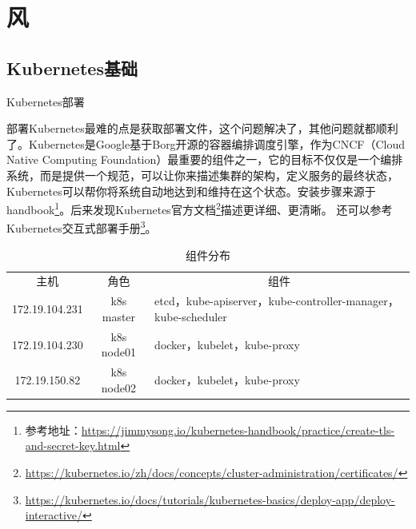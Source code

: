 \documentclass[8pt]{book}
\makeatletter
\numberwithin{dummy}{section}
\theoremstyle{ocrenumbox}
\theoremstyle{blacknumex}
\theoremstyle{blacknumbox}
\theoremstyle{ocrenum}
\renewcommand{\section}{\@startsection{section}{1}{\z@}
	{-4ex \@plus -1ex \@minus -.4ex}
	{1ex \@plus.2ex }
	{\normalfont\large\sffamily\bfseries}}
\newif\ifusechapterimage
\newcommand{\thechapterimage}{}%
\newcommand{\chapterimage}[1]{\ifusechapterimage\renewcommand{\thechapterimage}{#1}\fi}%
\makeatother
\begin{document}


\part{风}


\chapterimage{chapterhead2.pdf} %

\chapter{Kubernetes基础}

\section{Kubernetes部署}

部署Kubernetes最难的点是获取部署文件，这个问题解决了，其他问题就都顺利了。Kubernetes是Google基于Borg开源的容器编排调度引擎，作为CNCF（Cloud Native Computing Foundation）最重要的组件之一，它的目标不仅仅是一个编排系统，而是提供一个规范，可以让你来描述集群的架构，定义服务的最终状态，Kubernetes可以帮你将系统自动地达到和维持在这个状态。安装步骤来源于handbook\footnote{参考地址：\url{https://jimmysong.io/kubernetes-handbook/practice/create-tls-and-secret-key.html}}。后来发现Kubernetes官方文档\footnote{\url{https://kubernetes.io/zh/docs/concepts/cluster-administration/certificates/}}描述更详细、更清晰。 还可以参考Kubernetes交互式部署手册\footnote{\url{https://kubernetes.io/docs/tutorials/kubernetes-basics/deploy-app/deploy-interactive/}}。


\begin{table}[htbp]
	\caption{组件分布}
	\label{table:ca}
	\begin{center}
		\begin{tabular}{|c|c|p{7cm}|}
			\hline
			\multirow{1}{*}{主机}
			& \multicolumn{1}{c|}{角色}
			& \multicolumn{1}{c|}{组件}\\			
			\cline{1-3}
			172.19.104.231 & k8s master & etcd，kube-apiserver，kube-controller-manager，kube-scheduler  \\
			\hline
			172.19.104.230 & k8s node01  &  docker，kubelet，kube-proxy  \\
			\hline
			172.19.150.82 & k8s node02  &  docker，kubelet，kube-proxy  \\
			\hline						
		\end{tabular}	
	\end{center}
\end{table}
\end{document}
